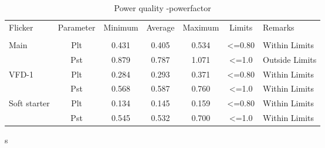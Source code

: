 \begin{table}[!htb]
	\caption{Power quality -powerfactor}
	\label{tbl_ch04_elecaudit_powerquality_flicker}
	{\scriptsize
		
\begin{tabular}{l|l|l|l|l|l|l}
	\hline
	Flicker & \multicolumn{1}{c|}{Parameter} & \multicolumn{1}{c|}{Minimum} & \multicolumn{1}{c|}{Average} & \multicolumn{1}{c|}{Maximum} & \multicolumn{1}{c|}{Limits} & Remarks \\ 
	& \multicolumn{1}{c|}{} & \multicolumn{1}{c|}{} & \multicolumn{1}{c|}{} & \multicolumn{1}{c|}{} & \multicolumn{1}{c|}{} &  \\ 
	\hline
	Main & \multicolumn{1}{c|}{Plt} & \multicolumn{1}{c|}{0.431} & \multicolumn{1}{c|}{0.405} & \multicolumn{1}{c|}{0.534} & \multicolumn{1}{c|}{<=0.80} & Within Limits \\ 
	& \multicolumn{1}{c|}{Pst} & \multicolumn{1}{c|}{0.879} & \multicolumn{1}{c|}{0.787} & \multicolumn{1}{c|}{1.071} & \multicolumn{1}{c|}{<=1.0} & Outside Limits \\ 
	\hline
	VFD-1 & \multicolumn{1}{c|}{Plt} & \multicolumn{1}{c|}{0.284} & \multicolumn{1}{c|}{0.293} & \multicolumn{1}{c|}{0.371} & \multicolumn{1}{c|}{<=0.80} & Within Limits \\ 
	& \multicolumn{1}{c|}{Pst} & \multicolumn{1}{c|}{0.568} & \multicolumn{1}{c|}{0.587} & \multicolumn{1}{c|}{0.760} & \multicolumn{1}{c|}{<=1.0} & Within Limits \\ 
	\hline
	Soft starter & \multicolumn{1}{c|}{Plt} & \multicolumn{1}{c|}{0.134} & \multicolumn{1}{c|}{0.145} & \multicolumn{1}{c|}{0.159} & \multicolumn{1}{c|}{<=0.80} & Within Limits \\ 
	& \multicolumn{1}{c|}{Pst} & \multicolumn{1}{c|}{0.545} & \multicolumn{1}{c|}{0.532} & \multicolumn{1}{c|}{0.700} & \multicolumn{1}{c|}{<=1.0} & Within Limits \\ 
	\hline
\end{tabular}s
		
	}%
\end{table}